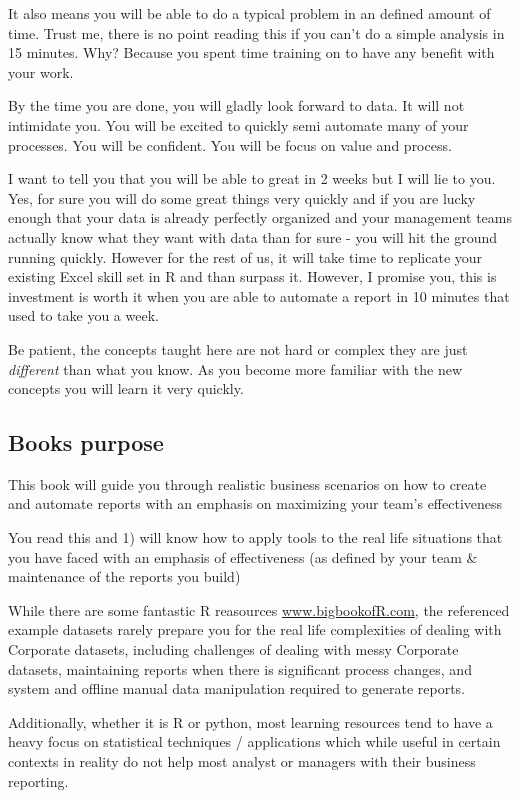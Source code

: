 \documentclass[
  letterpaper,
  DIV=11,
  numbers=noendperiod]{scrreprt}
\begin{document}
It also means you will be able to do a typical problem in an defined
amount of time. Trust me, there is no point reading this if you can't do
a simple analysis in 15 minutes. Why? Because you spent time training on
to have any benefit with your work.

By the time you are done, you will gladly look forward to data. It will
not intimidate you. You will be excited to quickly semi automate many of
your processes. You will be confident. You will be focus on value and
process.

I want to tell you that you will be able to great in 2 weeks but I will
lie to you. Yes, for sure you will do some great things very quickly and
if you are lucky enough that your data is already perfectly organized
and your management teams actually know what they want with data than
for sure - you will hit the ground running quickly. However for the rest
of us, it will take time to replicate your existing Excel skill set in R
and than surpass it. However, I promise you, this is investment is worth
it when you are able to automate a report in 10 minutes that used to
take you a week.

Be patient, the concepts taught here are not hard or complex they are
just \emph{different} than what you know. As you become more familiar
with the new concepts you will learn it very quickly.

\subsection*{Books purpose}\label{books-purpose}

This book will guide you through realistic business scenarios on how to
create and automate reports with an emphasis on maximizing your team's
effectiveness

You read this and 1) will know how to apply tools to the real life
situations that you have faced with an emphasis of effectiveness (as
defined by your team \& maintenance of the reports you build)

While there are some fantastic R reasources \url{www.bigbookofR.com},
the referenced example datasets rarely prepare you for the real life
complexities of dealing with Corporate datasets, including challenges of
dealing with messy Corporate datasets, maintaining reports when there is
significant process changes, and system and offline manual data
manipulation required to generate reports.

Additionally, whether it is R or python, most learning resources tend to
have a heavy focus on statistical techniques / applications which while
useful in certain contexts in reality do not help most analyst or
managers with their business reporting.
\end{document}
